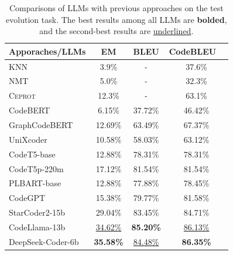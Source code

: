 \begin{table}
\centering
\footnotesize
\caption{Comparisons of LLMs with previous approaches on the test evolution task. The best results among all LLMs are \textbf{bolded}, and the second-best results are \uline{underlined}.}
\label{tab:tu_comparisons_llm}
\begin{tabular}{lccc}
\toprule
\textbf{Apporaches/LLMs} & \textbf{EM} & \textbf{BLEU} & \textbf{CodeBLEU}  \ \\
\midrule
KNN & 3.9\% & - & 37.6\% \\
NMT & 5.0\% & - & 32.3\% \\ 
\textsc{Ceprot} & 12.3\% & - & 63.1\% \\
\midrule
CodeBERT & 6.15\% & 37.72\% & 46.42\% \\
GraphCodeBERT & 12.69\% & 63.49\% & 67.37\% \\
UniXcoder & 10.58\% & 58.03\% & 63.12\% \\
CodeT5-base & 12.88\% & 78.31\% & 78.31\% \\
CodeT5p-220m & 17.12\% & 81.54\% & 81.54\% \\
PLBART-base & 12.88\% & 77.88\% & 78.45\% \\
CodeGPT & 15.38\% & 79.77\% & 81.58\% \\
StarCoder2-15b & 29.04\% & 83.45\% & 84.71\% \\
CodeLlama-13b & \uline{34.62\%} & \textbf{85.20\%} & \uline{86.13\%} \\
DeepSeek-Coder-6b & \textbf{35.58\%} & \uline{84.48\%} & \textbf{86.35\%} \\

\bottomrule
\end{tabular}
\end{table}
